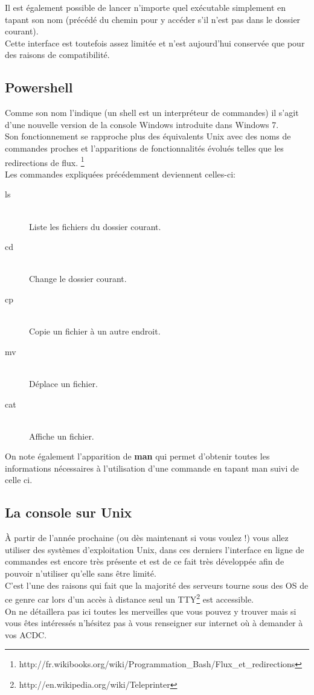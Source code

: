 Il est également possible de lancer n'importe quel exécutable simplement en
tapant son nom (précédé du chemin pour y accéder s'il n'est pas dans le dossier
courant).\\
Cette interface est toutefois assez limitée et n'est aujourd'hui conservée que
pour des raisons de compatibilité.

\subsection{Powershell}
Comme son nom l'indique (un shell est un interpréteur de commandes) il s'agit
d'une nouvelle version de la console Windows introduite dans Windows 7.\\
Son fonctionnement se rapproche plus des équivalents Unix avec des noms de
commandes proches et l'apparitions de fonctionnalités évolués telles que les
redirections de flux.
\footnote{http://fr.wikibooks.org/wiki/Programmation\_Bash/Flux\_et\_redirections}\\
Les commandes expliquées précédemment deviennent celles-ci:

\begin{description}
    \item[ls] \hfill \\
        Liste les fichiers du dossier courant.
    \item[cd] \hfill \\
        Change le dossier courant.
    \item[cp] \hfill \\
        Copie un fichier à un autre endroit.
    \item[mv] \hfill \\
        Déplace un fichier.
    \item[cat] \hfill \\
        Affiche un fichier.
\end{description}

On note également l'apparition de \textbf{man} qui permet d'obtenir toutes les
informations nécessaires à l'utilisation d'une commande en tapant man suivi de
celle ci.

\subsection{La console sur Unix}
À partir de l'année prochaine (ou dès maintenant si vous voulez !) vous allez
utiliser des systèmes d'exploitation Unix, dans ces derniers l'interface en
ligne de commandes est encore très présente et est de ce fait très développée
afin de pouvoir n'utiliser qu'elle sans être limité.\\
C'est l'une des raisons qui fait que la majorité des serveurs tourne sous des
OS de ce genre car lors d'un accès à distance seul un
TTY\footnote{http://en.wikipedia.org/wiki/Teleprinter} est accessible.\\
On ne détaillera pas ici toutes les merveilles que vous pouvez y trouver mais
si vous êtes intéressés n'hésitez pas à vous renseigner sur internet où à
demander à vos ACDC.


